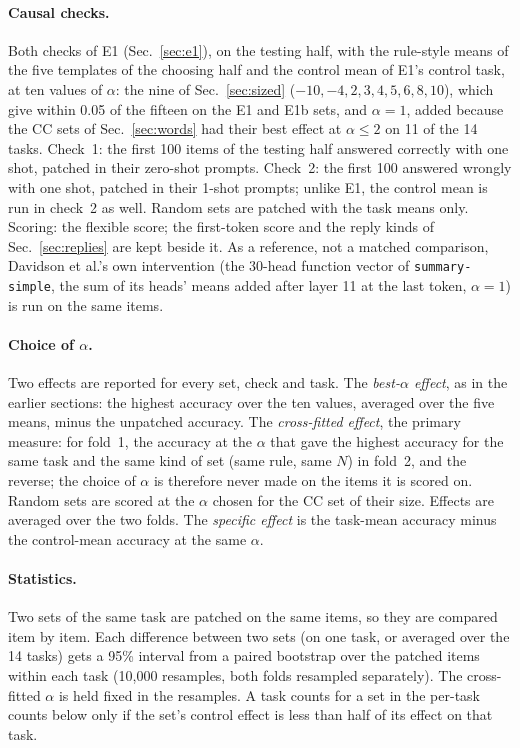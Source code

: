 \documentclass[11pt,a4paper]{article}
\begin{document}
\paragraph{Causal checks.} Both checks of E1 (Sec.~\ref{sec:e1}), on the testing half, with the
rule-style means of the five templates of the choosing half and the control mean of E1's
control task, at ten values of $\alpha$: the nine of Sec.~\ref{sec:sized} ($-10, -4, 2, 3, 4, 5, 6, 8, 10$),
which give within 0.05 of the fifteen on the E1 and E1b sets, and $\alpha = 1$, added because
the CC sets of Sec.~\ref{sec:words} had their best effect at $\alpha \le 2$ on 11 of the 14 tasks. Check~1: the first 100 items of
the testing half answered correctly with one shot, patched in their zero-shot prompts. Check~2:
the first 100 answered wrongly with one shot, patched in their 1-shot prompts; unlike E1, the
control mean is run in check~2 as well. Random sets are patched with the task means only.
Scoring: the flexible score; the first-token score and the reply kinds of Sec.~\ref{sec:replies} are kept beside
it. As a reference, not a matched comparison, Davidson et al.'s own intervention (the 30-head
function vector of \texttt{summary-simple}, the sum of its heads' means added after layer 11 at the last
token, $\alpha = 1$) is run on the
same items.

\paragraph{Choice of $\alpha$.} Two effects are reported for every set, check and task. The
\emph{best-$\alpha$ effect}, as in the earlier sections: the highest accuracy over the ten
values, averaged over the five means, minus the unpatched accuracy. The \emph{cross-fitted
effect}, the primary measure: for fold~1, the accuracy at the $\alpha$ that gave the highest
accuracy for the same task and the same kind of set (same rule, same $N$) in fold~2, and the
reverse; the
choice of $\alpha$ is therefore never made on the items it is scored on. Random sets are scored
at the $\alpha$ chosen for the CC set of their size. Effects are averaged over the two folds.
The \emph{specific effect} is the task-mean accuracy minus the control-mean accuracy at the
same $\alpha$.

\paragraph{Statistics.} Two sets of the same task are patched on the same items, so they are
compared item by item. Each difference between two sets (on one task, or averaged over the 14
tasks) gets a 95\% interval from a paired bootstrap over the patched items within each task
(10{,}000 resamples, both folds resampled separately). The cross-fitted $\alpha$ is held fixed
in the resamples. A task counts for a set in the
per-task counts below only if the set's control effect is less than half of its effect on that
task.
\end{document}
